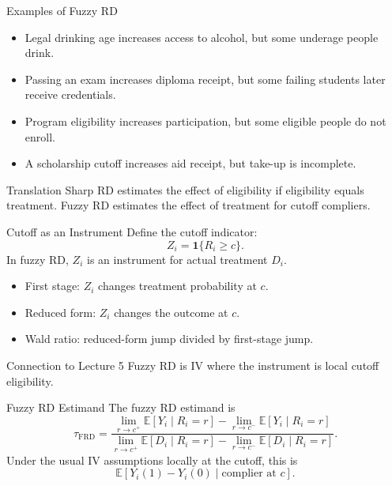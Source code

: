 \documentclass[11pt,aspectratio=169]{beamer}
\newcommand{\E}{\mathbb{E}}
\newcommand{\derivbutton}[1]{\vspace{0.4em}\hfill\hyperlink{app:#1}{\beamerbutton{Appendix details}}}
\begin{document}
\begin{frame}{Examples of Fuzzy RD}
  \begin{itemize}
    \item Legal drinking age increases access to alcohol, but some underage people drink.
    \item Passing an exam increases diploma receipt, but some failing students later receive credentials.
    \item Program eligibility increases participation, but some eligible people do not enroll.
    \item A scholarship cutoff increases aid receipt, but take-up is incomplete.
  \end{itemize}
  \begin{block}{Translation}
    Sharp RD estimates the effect of eligibility if eligibility equals treatment. Fuzzy RD estimates the effect of treatment for cutoff compliers.
  \end{block}
\end{frame}

\begin{frame}{Cutoff as an Instrument}
  Define the cutoff indicator:
  \[
    Z_i=\mathbf{1}\{R_i\geq c\}.
  \]
  In fuzzy RD, \(Z_i\) is an instrument for actual treatment \(D_i\).
  \begin{itemize}
    \item First stage: \(Z_i\) changes treatment probability at \(c\).
    \item Reduced form: \(Z_i\) changes the outcome at \(c\).
    \item Wald ratio: reduced-form jump divided by first-stage jump.
  \end{itemize}
  \begin{block}{Connection to Lecture 5}
    Fuzzy RD is IV where the instrument is local cutoff eligibility.
  \end{block}
\end{frame}

\begin{frame}{Fuzzy RD Estimand}
  \hypertarget{main:fuzzy-estimand}{}
  The fuzzy RD estimand is
  \[
    \tau_{\mathrm{FRD}}
    =
    \frac{
      \lim_{r\to c^+}\E[Y_i\mid R_i=r]
      -
      \lim_{r\to c^-}\E[Y_i\mid R_i=r]
    }{
      \lim_{r\to c^+}\E[D_i\mid R_i=r]
      -
      \lim_{r\to c^-}\E[D_i\mid R_i=r]
    }.
  \]
  Under the usual IV assumptions locally at the cutoff, this is
  \[
    \E[Y_i(1)-Y_i(0)\mid \text{complier at }c].
  \]
  \derivbutton{fuzzy-wald}
\end{frame}
\end{document}
